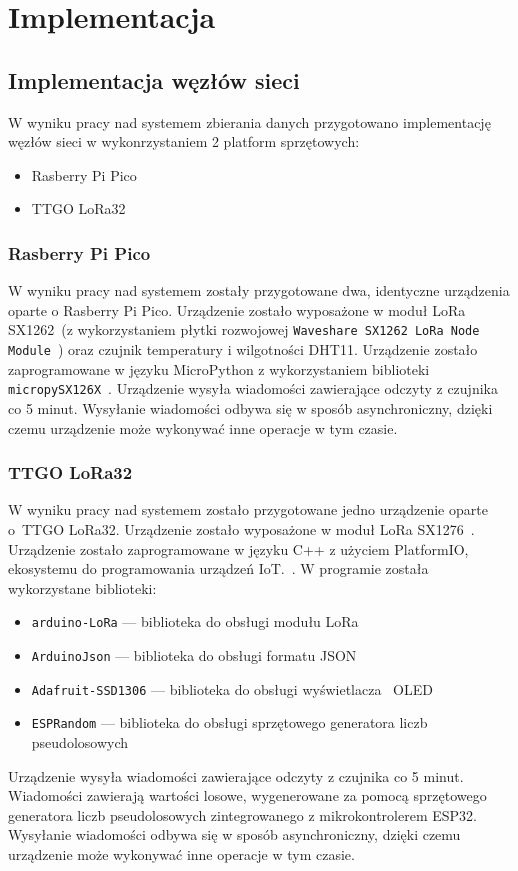 \section{Implementacja}
\subsection{Implementacja węzłów sieci}
W wyniku pracy nad systemem zbierania danych przygotowano implementację węzłów sieci w wykonrzystaniem 2 platform sprzętowych:
\begin{itemize}
    \item Rasberry Pi Pico
    \item TTGO LoRa32
\end{itemize}

\subsubsection{Rasberry Pi Pico}
W wyniku pracy nad systemem zostały przygotowane dwa, identyczne urządzenia oparte o Rasberry Pi Pico. Urządzenie zostało wyposażone w moduł LoRa SX1262~\cite{PICO:sx1262-doc}(z wykorzystaniem płytki rozwojowej \texttt{Waveshare SX1262 LoRa Node Module}~\cite{PICO:waveshare-doc}) oraz czujnik temperatury i wilgotności DHT11. Urządzenie zostało zaprogramowane w języku MicroPython z wykorzystaniem biblioteki \texttt{micropySX126X}~\cite{PICO:lora-lib}. Urządzenie wysyła wiadomości zawierające odczyty z czujnika co 5 minut. Wysyłanie wiadomości odbywa się w sposób asynchroniczny, dzięki czemu urządzenie może wykonywać inne operacje w tym czasie.

\subsubsection{TTGO LoRa32}
W wyniku pracy nad systemem zostało przygotowane jedno urządzenie oparte o~TTGO LoRa32. Urządzenie zostało wyposażone w moduł LoRa SX1276~\cite{ESP32:sx1276-doc}. Urządzenie zostało zaprogramowane w języku C++ z użyciem PlatformIO, ekosystemu do programowania urządzeń IoT.~\cite{tool:pio}. W programie została wykorzystane biblioteki:
\begin{itemize}
    \item \texttt{arduino-LoRa} — biblioteka do obsługi modułu LoRa
          ~\cite{ESP32:lora-lib}
    \item \texttt{ArduinoJson} — biblioteka do obsługi formatu JSON~\cite{ESP32:ArduinoJson}
    \item \texttt{Adafruit-SSD1306} — biblioteka do obsługi wyświetlacza~\cite{ESP32:Adafruit-SSD1306} OLED
    \item \texttt{ESPRandom} — biblioteka do obsługi sprzętowego generatora liczb pseudolosowych~\cite{ESP32:ESPRandom}
\end{itemize}
Urządzenie wysyła wiadomości zawierające odczyty z czujnika co 5 minut. Wiadomości zawierają wartości losowe, wygenerowane za pomocą sprzętowego generatora liczb pseudolosowych zintegrowanego z mikrokontrolerem ESP32.  Wysyłanie wiadomości odbywa się w sposób asynchroniczny, dzięki czemu urządzenie może wykonywać inne operacje w tym czasie.

